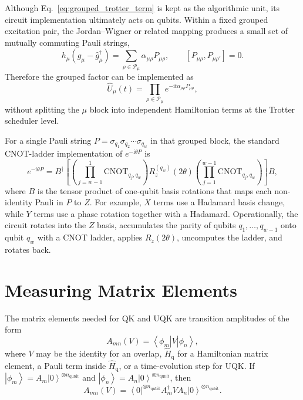 \documentclass[11pt]{article}
\newcommand{\ii}{\mathrm{i}}
\newcommand{\ket}[1]{\left|#1\right\rangle}
\newcommand{\bra}[1]{\left\langle#1\right|}
\begin{document}
Although Eq.~\eqref{eq:grouped_trotter_term} is kept as the algorithmic unit, its circuit implementation ultimately acts on qubits.  Within a fixed grouped excitation pair, the Jordan--Wigner or related mapping produces a small set of mutually commuting Pauli strings,
\begin{equation}
    h_\mu(\hat{g}_\mu-\hat{g}_\mu^\dagger)
    = \sum_{\rho\in\mathcal{P}_\mu}\alpha_{\mu\rho}P_{\mu\rho},
    \qquad [P_{\mu\rho},P_{\mu\rho'}]=0.
\end{equation}
Therefore the grouped factor can be implemented as
\begin{equation}
    \hat{U}_\mu(t)
    = \prod_{\rho\in\mathcal{P}_\mu}
    e^{-\ii t\alpha_{\mu\rho}P_{\mu\rho}},
\end{equation}
without splitting the $\mu$ block into independent Hamiltonian terms at the Trotter scheduler level.

For a single Pauli string $P=\sigma_{q_1}\sigma_{q_2}\cdots\sigma_{q_w}$ in that grouped block, the standard CNOT-ladder implementation of $e^{-\ii\theta P}$ is
\begin{equation}
    e^{-\ii\theta P}
    = B^\dagger
    \left[
    \left(\prod_{j=w-1}^{1}\mathrm{CNOT}_{q_j,q_w}\right)
    R_z^{(q_w)}(2\theta)
    \left(\prod_{j=1}^{w-1}\mathrm{CNOT}_{q_j,q_w}\right)
    \right]B,
    \label{eq:cnot_ladder}
\end{equation}
where $B$ is the tensor product of one-qubit basis rotations that maps each non-identity Pauli in $P$ to $Z$.  For example, $X$ terms use a Hadamard basis change, while $Y$ terms use a phase rotation together with a Hadamard.  Operationally, the circuit rotates into the $Z$ basis, accumulates the parity of qubits $q_1,\ldots,q_{w-1}$ onto qubit $q_w$ with a CNOT ladder, applies $R_z(2\theta)$, uncomputes the ladder, and rotates back.

\section{Measuring Matrix Elements}

The matrix elements needed for QK and UQK are transition amplitudes of the form
\begin{equation}
    A_{mn}(V)=\bra{\phi_m}V\ket{\phi_n},
\end{equation}
where $V$ may be the identity for an overlap, $\hat{H}_{\mathrm{q}}$ for a Hamiltonian matrix element, a Pauli term inside $\hat{H}_{\mathrm{q}}$, or a time-evolution step for UQK.  If $\ket{\phi_m}=A_m\ket{0}^{\otimes n_{\mathrm{qubit}}}$ and $\ket{\phi_n}=A_n\ket{0}^{\otimes n_{\mathrm{qubit}}}$, then
\begin{equation}
    A_{mn}(V)
    = \bra{0}^{\otimes n_{\mathrm{qubit}}}A_m^\dagger V A_n\ket{0}^{\otimes n_{\mathrm{qubit}}}.
\end{equation}
\end{document}
